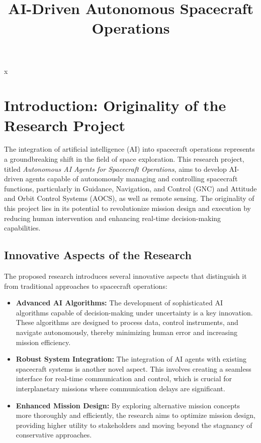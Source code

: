 \documentclass[a4paper,12pt]{article}
\title{AI-Driven Autonomous Spacecraft Operations}
\author{}
\date{}
\begin{document}
\maketitle
\tableofcontents
\newpage

x
\section{Introduction: Originality of the Research Project}

The integration of artificial intelligence (AI) into spacecraft operations represents a groundbreaking shift in the field of space exploration. This research project, titled \textit{Autonomous AI Agents for Spacecraft Operations}, aims to develop AI-driven agents capable of autonomously managing and controlling spacecraft functions, particularly in Guidance, Navigation, and Control (GNC) and Attitude and Orbit Control Systems (AOCS), as well as remote sensing. The originality of this project lies in its potential to revolutionize mission design and execution by reducing human intervention and enhancing real-time decision-making capabilities.

\subsection{Innovative Aspects of the Research}

The proposed research introduces several innovative aspects that distinguish it from traditional approaches to spacecraft operations:

\begin{itemize}
    \item \textbf{Advanced AI Algorithms:} The development of sophisticated AI algorithms capable of decision-making under uncertainty is a key innovation. These algorithms are designed to process data, control instruments, and navigate autonomously, thereby minimizing human error and increasing mission efficiency.
    \item \textbf{Robust System Integration:} The integration of AI agents with existing spacecraft systems is another novel aspect. This involves creating a seamless interface for real-time communication and control, which is crucial for interplanetary missions where communication delays are significant.
    \item \textbf{Enhanced Mission Design:} By exploring alternative mission concepts more thoroughly and efficiently, the research aims to optimize mission design, providing higher utility to stakeholders and moving beyond the stagnancy of conservative approaches.
\end{itemize}
\end{document}
